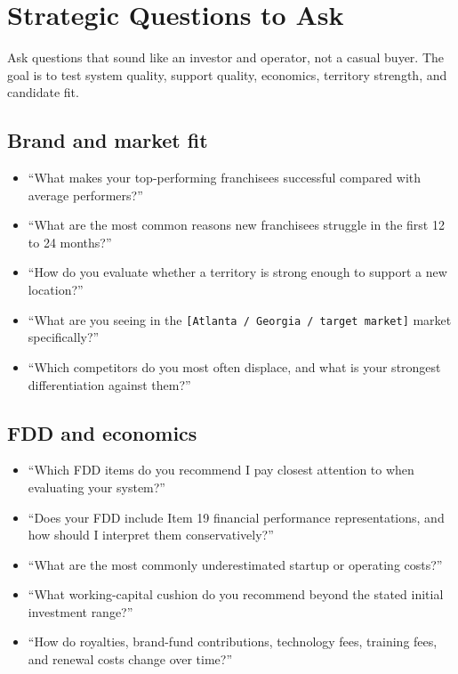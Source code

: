 \documentclass[11pt]{article}
\newcommand{\placeholder}[1]{\textcolor{accent}{\texttt{[#1]}}}
\begin{document}
\section{Strategic Questions to Ask}

Ask questions that sound like an investor and operator, not a casual buyer. The goal is to test system quality, support quality, economics, territory strength, and candidate fit.

\subsection{Brand and market fit}

\begin{itemize}
  \item ``What makes your top-performing franchisees successful compared with average performers?''
  \item ``What are the most common reasons new franchisees struggle in the first 12 to 24 months?''
  \item ``How do you evaluate whether a territory is strong enough to support a new location?''
  \item ``What are you seeing in the \placeholder{Atlanta / Georgia / target market} market specifically?''
  \item ``Which competitors do you most often displace, and what is your strongest differentiation against them?''
\end{itemize}

\subsection{FDD and economics}

\begin{itemize}
  \item ``Which FDD items do you recommend I pay closest attention to when evaluating your system?''
  \item ``Does your FDD include Item 19 financial performance representations, and how should I interpret them conservatively?''
  \item ``What are the most commonly underestimated startup or operating costs?''
  \item ``What working-capital cushion do you recommend beyond the stated initial investment range?''
  \item ``How do royalties, brand-fund contributions, technology fees, training fees, and renewal costs change over time?''
\end{itemize}
\end{document}
